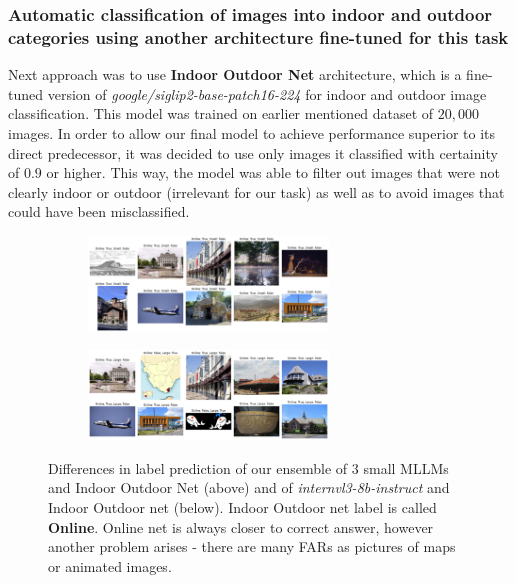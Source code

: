 \documentclass[a4paper]{article}
\begin{document}
\subsubsection{Automatic classification of images into indoor and outdoor categories using another architecture fine-tuned for this task}

Next approach was to use \textbf{Indoor Outdoor Net} architecture, which is a fine-tuned version of \textit{google/siglip2-base-patch16-224} for indoor and outdoor image classification. This model was trained on earlier mentioned dataset of $20,000$ images. In order to allow our final model to achieve performance superior to its direct predecessor, it was decided to use only images it classified with certainity of $0.9$ or higher. This way, the model was able to filter out images that were not clearly indoor or outdoor (irrelevant for our task) as well as to avoid images that could have been misclassified.

\begin{figure}[H]
    \centering
    \begin{subfigure}[b]{\textwidth}
        \centering
        \includegraphics[width=0.7\textwidth]{images/small-online.png}
    \end{subfigure}

    \vspace{0.5cm}

    \begin{subfigure}[b]{\textwidth}
        \centering
        \includegraphics[width=0.7\textwidth]{images/large-online.png}
    \end{subfigure}
    \caption{Differences in label prediction of our ensemble of $3$ small MLLMs and Indoor Outdoor Net (above) and of \textit{internvl3-8b-instruct} and Indoor Outdoor net (below). Indoor Outdoor net label is called \textbf{Online}. Online net is always closer to correct answer, however another problem arises - there are many FARs as pictures of maps or animated images.}
\end{figure}
\end{document}
